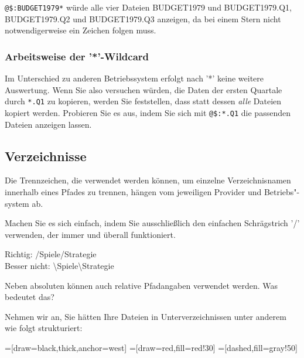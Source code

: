 \documentclass[10pt,a4paper]{scrartcl}		%
\begin{document}
\texttt{@\$:BUDGET1979*} würde alle vier Dateien BUDGET1979 und 
BUDGET1979.Q1, BUDGET1979.Q2 und BUDGET1979.Q3 anzeigen, da bei
einem Stern nicht notwendigerweise ein Zeichen folgen muss.

\subsubsection*{Arbeitsweise der '*'-Wildcard}
\label{starwc}
Im Unterschied zu anderen Betriebssystem erfolgt nach '*' keine
weitere Auswertung. Wenn Sie also versuchen würden, die Daten
der ersten Quartale durch \texttt{*.Q1} zu kopieren, werden Sie
feststellen, dass statt dessen \textit{alle} Dateien kopiert werden.
Probieren Sie es aus, indem Sie sich mit \texttt{@\$:*.Q1} die
passenden Dateien anzeigen lassen.

\subsection{Verzeichnisse}
Die Trennzeichen, die verwendet werden können, um einzelne 
Verzeichnisnamen innerhalb eines Pfades zu trennen, hängen vom
jeweiligen Provider und Betriebs"-system ab. 

Machen Sie es sich einfach, indem Sie ausschließlich
den einfachen Schrägstrich '/' verwenden, der immer und 
überall funktioniert.

Richtig: /Spiele/Strategie\\
Besser nicht: \textbackslash Spiele\textbackslash Strategie

Neben absoluten können auch relative Pfadangaben verwendet werden.
Was bedeutet das?

Nehmen wir an, Sie hätten Ihre Dateien 
in Unterverzeichnissen unter anderem wie folgt strukturiert:

=[draw=black,thick,anchor=west]
=[draw=red,fill=red!30]
=[dashed,fill=gray!50]
\end{document}
